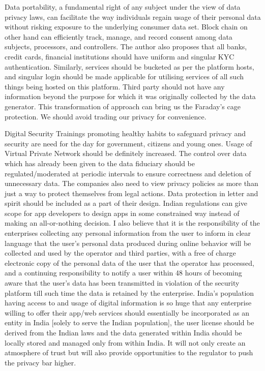 \begin{multicols}{2}
Data portability, a fundamental right of any subject under the view of data privacy laws, can facilitate the way individuals regain usage of their personal data without risking exposure to the underlying consumer data set. Block chain on other hand can efficiently track, manage, and record consent among data subjects, processors, and controllers. The author also proposes that all banks, credit cards, financial institutions should have uniform and singular KYC authentication. Similarly, services should be bucketed as per the platform hosts, and singular login should be made applicable for utilising services of all such things being hosted on this platform. Third party should not have any information beyond the purpose for which it was originally collected by the data generator. This transformation of approach can bring us the Faraday’s cage protection. We should avoid trading our privacy for convenience.

Digital Security Trainings promoting healthy habits to safeguard privacy and security are need for the day for government, citizens and young ones. Usage of Virtual Private Network should be definitely increased. The control over data which has already been given to the data fiduciary should be regulated/moderated at periodic intervals to ensure correctness and deletion of unnecessary data. The companies also need to view privacy policies as more than just a way to protect themselves from legal actions. Data protection in letter and spirit should be included as a part of their design. Indian regulations can give scope for app developers to design apps in some constrained way instead of making an all-or-nothing decision. I also believe that it is the responsibility of the enterprises collecting any personal information from the user to inform in clear language that the user's personal data produced during online behavior will be collected and used by the operator and third parties, with a free of charge electronic copy of the personal data of the user that the operator has processed, and a continuing responsibility to notify a user within 48 hours of becoming aware that the user's data has been transmitted in violation of the security platform till such time the data is retained by the enterprise. India’s population having access to and usage of digital information is so huge that any enterprise willing to offer their app/web services should essentially be incorporated as an entity in India [solely to serve the Indian population], the user license should be derived from the Indian laws and the data generated within India should be locally stored and managed only from within India. It will not only create an atmosphere of trust but will also provide opportunities to the regulator to push the privacy bar higher. 


\end{multicols}
